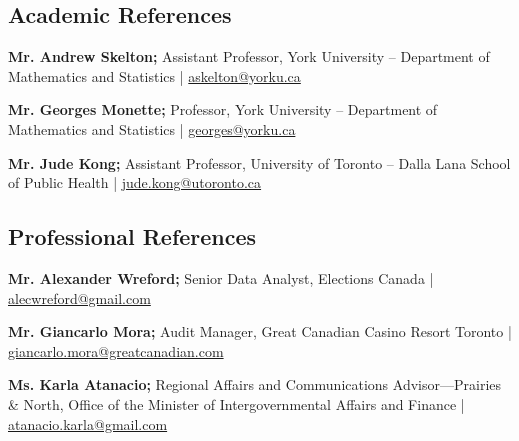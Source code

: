 
\subsection{{Academic References}}
\begin{zitemize}
\item \textbf{Mr. Andrew Skelton;} Assistant Professor, York University – Department of Mathematics and Statistics | \href{mailto:askelton@yorku.ca}{askelton@yorku.ca}
\item \textbf{Mr. Georges Monette;} Professor, York University – Department of Mathematics and Statistics | \href{mailto:georges@yorku.ca}{georges@yorku.ca}
\item \textbf{Mr. Jude Kong;} Assistant Professor, University of Toronto – Dalla Lana School of Public Health | \href{mailto:jude.kong@utoronto.ca}{jude.kong@utoronto.ca}
\end{zitemize}

\subsection{{Professional References}}
\begin{zitemize}
\item \textbf{Mr. Alexander Wreford;} Senior Data Analyst, Elections Canada | \href{mailto:alecwreford@gmail.com}{alecwreford@gmail.com}
\item \textbf{Mr. Giancarlo Mora;} Audit Manager, Great Canadian Casino Resort Toronto | \href{mailto:giancarlo.mora@greatcanadian.com}{giancarlo.mora@greatcanadian.com}
\item \textbf{Ms. Karla Atanacio;} Regional Affairs and Communications Advisor---Prairies \& North, Office of the Minister of Intergovernmental Affairs and Finance | \href{mailto:atanacio.karla@gmail.com }{atanacio.karla@gmail.com}
\end{zitemize}